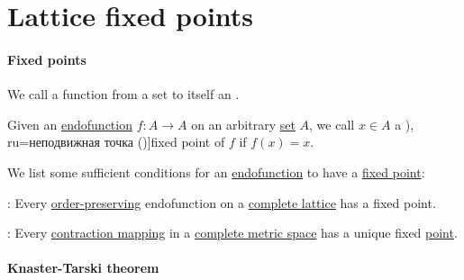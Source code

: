 \section{Lattice fixed points}\label{sec:lattice_fixed_points}

\paragraph{Fixed points}

\begin{definition}\label{def:endofunction}
  We call a function from a set to itself an .
\end{definition}

\begin{definition}\label{def:function_fixed_point}
  Given an \hyperref[def:endofunction]{endofunction} \( f: A \to A \) on an arbitrary \hyperref[def:set]{set} \( A \), we call \( x \in A \) a \term[bg=неподвижна точка (\cite[138]{Боянов2008ЧислениМетоди}), ru=неподвижная точка (\cite[\S 1.8.6]{Новиков2013ДискретнаяМатематика})]{fixed point} of \( f \) if \( f(x) = x \).
\end{definition}

\begin{theorem}\label{thm:fixed_point_existence}
  We list some sufficient conditions for an \hyperref[def:endofunction]{endofunction} to have a \hyperref[def:function_fixed_point]{fixed point}:
  \begin{thmenum}
     : Every \hyperref[def:order_function]{order-preserving} endofunction on a \hyperref[def:complete_lattice]{complete lattice} has a fixed point.

     : Every \hyperref[def:lipschitz_continuity/contraction]{contraction mapping} in a \hyperref[def:complete_metric_space]{complete metric space} has a unique fixed \hyperref[def:function_fixed_point]{point}.
  \end{thmenum}
\end{theorem}

\paragraph{Knaster-Tarski theorem}

